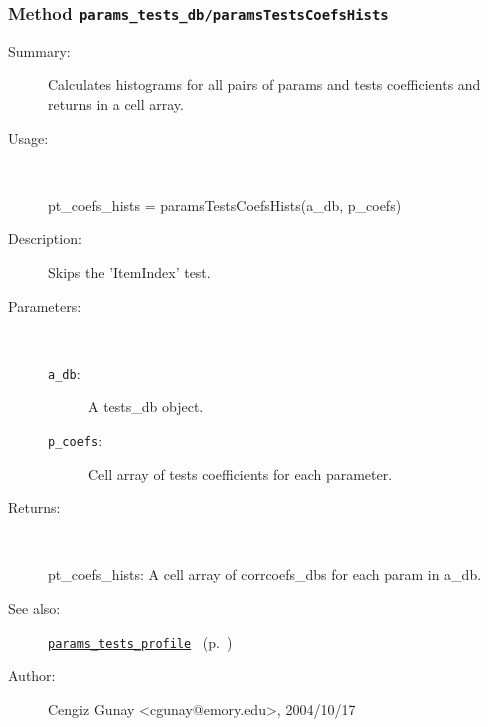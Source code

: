 \subsubsection[Method \texttt{paramsTestsCoefsHists}]{Method \texttt{params\_tests\_db/paramsTestsCoefsHists}}%
%
\label{ref_params_tests_db__paramsTestsCoefsHists}%
\hypertarget{ref_params_tests_db__paramsTestsCoefsHists}{}%
\begin{description}
\item[Summary:]Calculates histograms for all pairs of params 
		  and tests coefficients and returns in a cell array.
%
\item[Usage:]~%
\begin{lyxcode}%
pt\_coefs\_hists = paramsTestsCoefsHists(a\_db, p\_coefs)
%
\end{lyxcode}%
%
\item[Description:]%
Skips the 'ItemIndex' test.
\item[Parameters:]~
\begin{description}%
\item[\texttt{a\_db}:]
 A tests\_db object.
\item[\texttt{p\_coefs}:]
 Cell array of tests coefficients for each parameter.
\end{description}%
%
\item[Returns:]~

	pt\_coefs\_hists: A cell array of corrcoefs\_dbs for each param in a\_db.
%
%
\item[See also:]%
\hyperlink{ref_params_tests_profile}{\texttt{params\_tests\_profile}}%
\ (p.~\pageref{ref_params_tests_profile})%
%
%
\item[Author:]%
Cengiz Gunay <cgunay@emory.edu>, 2004/10/17%
\end{description}
\methodline%
